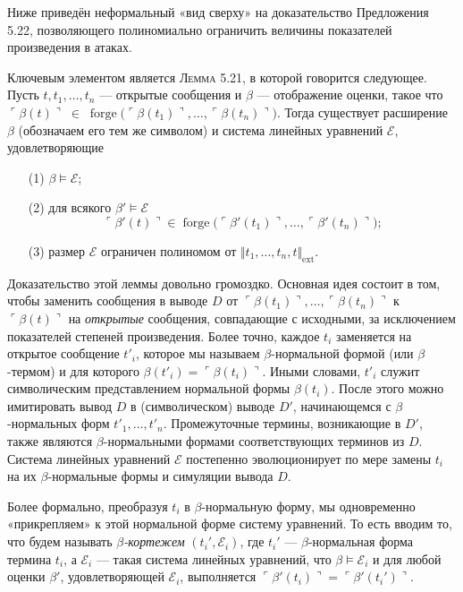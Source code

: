 Ниже приведён неформальный «вид сверху» на доказательство
Предложения 5.22, позволяющего полиномиально ограничить величины
показателей произведения в атаках.

\medskip
Ключевым элементом является \textsc{Лемма 5.21}, в которой говорится
следующее.  
Пусть $t,t_{1},\dots,t_{n}$ — открытые сообщения и
$\beta$ — отображение оценки, такое что
\(
  \ulcorner\beta(t)\urcorner\;\in\;
  \operatorname{forge}
  \bigl(\ulcorner\beta(t_{1})\urcorner,\dots,
        \ulcorner\beta(t_{n})\urcorner\bigr).
\)
Тогда существует расширение $\beta$
(обозначаем его тем же символом) и система линейных уравнений
$\mathcal E$, удовлетворяющие

\begin{enumerate}\itemsep0pt
\item[(1)] $\beta\models\mathcal E$;
\item[(2)] для всякого $\beta'\models\mathcal E$
\[
  \ulcorner\beta'(t)\urcorner\in
  \operatorname{forge}
  \bigl(\ulcorner\beta'(t_{1})\urcorner,\dots,
        \ulcorner\beta'(t_{n})\urcorner\bigr);
\]
\item[(3)] размер $\mathcal E$ ограничен полиномом
      от $\Vert t_{1},\dots,t_{n},t\Vert_{\text{ext}}$.
\end{enumerate}

Доказательство этой леммы довольно громоздко. Основная идея состоит в том, чтобы заменить сообщения в выводе
\(D\) от \(\ulcorner\beta(t_{1})\urcorner,\dots,\ulcorner\beta(t_{n})\urcorner\) к \(\ulcorner\beta(t)\urcorner\)
на \emph{открытые} сообщения, совпадающие с исходными, за исключением показателей степеней произведения.
Более точно, каждое \(t_{i}\) заменяется на открытое сообщение \(t'_{i}\),
которое мы называем \(\beta\)-нормальной формой (или \(\beta\)-термом) и для которого
\(\beta(t'_{i})=\ulcorner \beta(t_{i})\urcorner\).
Иными словами, \(t'_{i}\) служит символическим представлением нормальной формы \(\beta(t_{i})\).
После этого можно имитировать вывод \(D\) в (символическом) выводе \(D'\),
начинающемся с \(\beta\)-нормальных форм \(t'_{1},\dots,t'_{n}\).
Промежуточные термины, возникающие в \(D'\), также являются \(\beta\)-нормальными формами
соответствующих терминов из \(D\).
Система линейных уравнений \(\mathcal E\) постепенно эволюционирует
по мере замены \(t_{i}\) на их \(\beta\)-нормальные формы и симуляции вывода \(D\).

Более формально, преобразуя $t_i$ в $\beta$-нормальную форму,
мы одновременно «прикрепляем» к этой нормальной форме систему уравнений.
То есть вводим то, что будем называть \emph{$\beta$-кортежем}
\((t_i',\mathcal E_i)\),
где $t_i'$ — $\beta$-нормальная форма термина $t_i$,
а $\mathcal E_i$ — такая система линейных уравнений, что
\(\beta\models\mathcal E_i\)
и для любой оценки $\beta'$,
удовлетворяющей $\mathcal E_i$, выполняется
\(
  \ulcorner\beta'(t_i)\urcorner = \ulcorner\beta'(t_i')\urcorner.
\)

